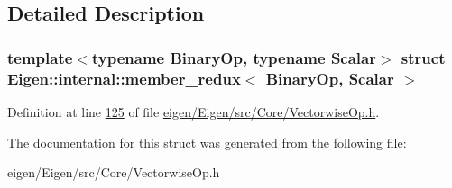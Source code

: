 \subsection{Detailed Description}
\subsubsection*{template$<$typename Binary\+Op, typename Scalar$>$\newline
struct Eigen\+::internal\+::member\+\_\+redux$<$ Binary\+Op, Scalar $>$}



Definition at line \hyperlink{eigen_2_eigen_2src_2_core_2_vectorwise_op_8h_source_l00125}{125} of file \hyperlink{eigen_2_eigen_2src_2_core_2_vectorwise_op_8h_source}{eigen/\+Eigen/src/\+Core/\+Vectorwise\+Op.\+h}.



The documentation for this struct was generated from the following file\+:\begin{DoxyCompactItemize}
\item 
eigen/\+Eigen/src/\+Core/\+Vectorwise\+Op.\+h\end{DoxyCompactItemize}
